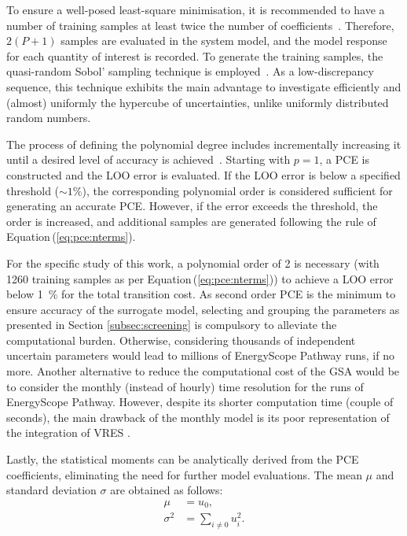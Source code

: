 To ensure a well-posed least-square minimisation, it is recommended to have a number of training samples at least twice the number of coefficients~\cite{Sudret2014}. Therefore, $2 \left( P+1 \right)$ samples are evaluated in the system model, and the model response for each quantity of interest is recorded. To generate the training samples, the quasi-random Sobol' sampling technique is employed~\cite{bratley2003implementing}. As a low-discrepancy sequence, this technique exhibits the main advantage to investigate efficiently and (almost) uniformly the hypercube of uncertainties, unlike uniformly distributed random numbers.

The process of defining the polynomial degree includes incrementally increasing it until a desired level of accuracy is achieved~\cite{coppitters2022rheia}. Starting with $p=1$, a PCE is constructed and the \gls{LOO} error is evaluated. If the \gls{LOO} error is below a specified threshold ($\sim 1\%$), the corresponding polynomial order is considered sufficient for generating an accurate PCE. However, if the error exceeds the threshold, the order is increased, and additional samples are generated following the rule of Equation\,(\ref{eq:pce:nterms}).

For the specific study of this work, a polynomial order of 2 is necessary (with 1260 training samples as per Equation\,(\ref{eq:pce:nterms})) to achieve a \gls{LOO} error below \SI{1}{\%} for the total transition cost. As second order \gls{PCE} is the minimum to ensure accuracy of the surrogate model, selecting and grouping the parameters as presented in Section \ref{subsec:screening} is compulsory to alleviate the computational burden. Otherwise, considering thousands of independent uncertain parameters would lead to millions of EnergyScope Pathway runs, if no more. Another alternative to reduce the computational cost of the \gls{GSA} would be to consider the monthly (instead of hourly) time resolution for the runs of EnergyScope Pathway. However, despite its shorter computation time (\ie couple of seconds), the main drawback of the monthly model is its poor representation of the integration of \gls{VRES} \cite{limpens2024pathway}.  

Lastly, the statistical moments can be analytically derived from the PCE coefficients, eliminating the need for further model evaluations. The mean $\mu$ and standard deviation $\sigma$ are obtained as follows:
\begin{align}
\mu &= u_0,\\
\sigma^2 &= \sum_{i \neq 0 } u_{i}^2 .
\label{eq:pce:statmom}
\end{align}

